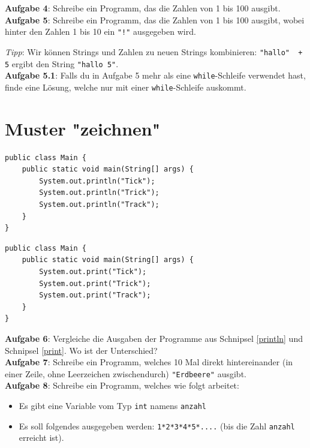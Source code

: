 \documentclass[ngerman,11pt]{article}
\begin{document}
    \textbf{Aufgabe 4}: Schreibe ein Programm, das die Zahlen von 1 bis 100 ausgibt. \\

    \textbf{Aufgabe 5}: Schreibe ein Programm, das die Zahlen von 1 bis 100 ausgibt, wobei hinter den Zahlen 1 bis 10 ein \lstinline{"!"} ausgegeben wird.

    \textit{Tipp}: Wir können Strings und Zahlen zu neuen Strings kombinieren: \lstinline{"hallo"  + 5} ergibt den String \lstinline{"hallo 5"}. \\

    \textbf{Aufgabe 5.1}: Falls du in Aufgabe 5 mehr als eine \lstinline{while}-Schleife verwendet hast, finde eine Lösung, welche nur mit einer \lstinline{while}-Schleife auskommt. \\

    \newpage
    \section{Muster "zeichnen"}

    \begin{lstlisting}[caption={mehrzeilige Ausgabe}, label={println}]
public class Main {
    public static void main(String[] args) {
        System.out.println("Tick");
        System.out.println("Trick");
        System.out.println("Track");
    }
}
    \end{lstlisting}
    \begin{lstlisting}[caption={einzeilige Ausgabe}, label={print}]
public class Main {
    public static void main(String[] args) {
        System.out.print("Tick");
        System.out.print("Trick");
        System.out.print("Track");
    }
}
    \end{lstlisting}

    \textbf{Aufgabe 6}: Vergleiche die Ausgaben der Programme aus Schnipsel \ref{println} und Schnipsel \ref{print}.
    Wo ist der Unterschied? \\

    \textbf{Aufgabe 7}: Schreibe ein Programm, welches 10 Mal direkt hintereinander (in einer Zeile, ohne Leerzeichen zwischendurch) \lstinline{"Erdbeere"} ausgibt. \\

    \textbf{Aufgabe 8}: Schreibe ein Programm, welches wie folgt arbeitet:
    \begin{itemize}
        \item Es gibt eine Variable vom Typ \lstinline{int} namens \lstinline{anzahl}
        \item Es soll folgendes ausgegeben werden: \lstinline{1*2*3*4*5*....} (bis die Zahl \lstinline{anzahl} erreicht ist).
    \end{itemize} \\
\end{document}
